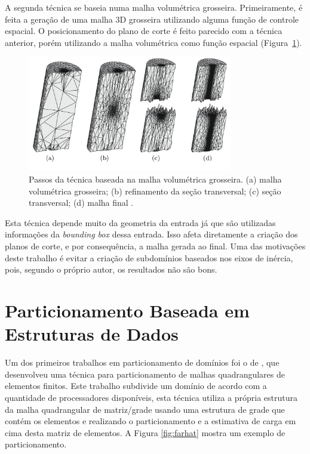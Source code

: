  A segunda técnica se baseia numa malha volumétrica grosseira. Primeiramente, é feita a geração de uma malha 3D grosseira utilizando alguma função de controle espacial. O posicionamento do plano de corte é feito parecido com a técnica anterior, porém utilizando a malha volumétrica como função espacial (Figura~\ref{fig:glut08_2}).
 
 \begin{figure}[!ht]
 	\centering
 	\includegraphics[width=0.8\textwidth]{fig/glut08_2.jpg}
 	\caption{Passos da técnica baseada na malha volumétrica grosseira. (a) malha volumétrica grosseira; (b) refinamento da seção transversal; (c) seção transversal; (d) malha final \cite{bib:Glut08}.}
 	\label{fig:glut08_2}
 \end{figure}
 
 
 Esta técnica depende muito da geometria da entrada já que são utilizadas informações da \textit{bounding box} dessa entrada. Isso afeta diretamente a criação dos planos de corte, e por consequência, a malha gerada ao final. Uma das motivações deste trabalho é evitar a criação de subdomínios baseados nos eixos de inércia, pois, segundo o próprio autor, os resultados não são bons.
 
 
 
\section{Particionamento Baseada em Estruturas de Dados} 
\label{sec:decomposição_est_dados}


Um dos primeiros trabalhos em particionamento de domínios foi o de \cite{bib:FARHAT88}, que desenvolveu uma técnica para particionamento de malhas quadrangulares de elementos finitos. Este trabalho subdivide um domínio de acordo com a quantidade de processadores disponíveis, esta técnica utiliza a própria estrutura da malha quadrangular de matriz/grade usando uma estrutura de grade que contém os elementos e realizando o particionamento e a estimativa de carga em cima desta matriz de elementos. A Figura \ref{fig:farhat} mostra um exemplo de particionamento.


